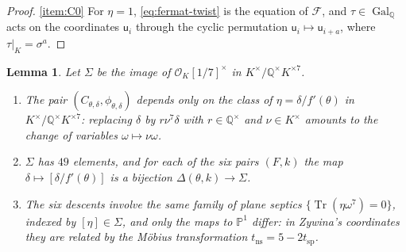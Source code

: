 \documentclass[12pt]{amsart}
\renewcommand{\P}{\mathbb{P}}
\newcommand{\Q}{\mathbb{Q}}
\newcommand{\Pone}{\P^{1}}
\newcommand{\calF}{{\mathcal F}}
\newcommand{\OO}{{\mathcal O}}
\newcommand{\sfu}{\mathsf{u}}
\DeclareMathOperator{\ns}{ns}
\DeclareMathOperator{\spc}{sp}
\DeclareMathOperator{\Gal}{Gal}
\DeclareMathOperator{\Tr}{Tr}
\numberwithin{equation}{section}
\newtheorem{lemma}[theorem]{Lemma}
\theoremstyle{definition}
\begin{document}
\begin{proof}
  \eqref{item:C0} For $\eta = 1$, \cref{eq:fermat-twist} is the equation of
  $\calF$, and $\tau \in \Gal_{\Q}$ acts on the coordinates $\sfu_i$ through
  the cyclic permutation $\sfu_i \mapsto \sfu_{i+a}$, where $\tau|_K = \sigma^a$.
\end{proof}

\begin{lemma}
  \label{lem:one-family}
  Let $\Sigma$ be the image of $\OO_K[1/7]^{\times}$ in
  $K^{\times}/\Q^{\times}K^{\times 7}$.
  \begin{enumerate}
  \item \label{item:eta-class} The pair $(C_{\theta,\delta},\phi_{\theta,\delta})$
    depends only on the class of $\eta = \delta/f'(\theta)$ in
    $K^{\times}/\Q^{\times}K^{\times 7}$: replacing $\delta$ by $r\nu^{7}\delta$
    with $r \in \Q^{\times}$ and $\nu \in K^{\times}$ amounts to the change of
    variables $\omega \mapsto \nu\omega$.
  \item \label{item:bijection} $\Sigma$ has $49$ elements, and for each of the
    six pairs $(F,k)$ the map $\delta \mapsto [\delta/f'(\theta)]$ is a bijection
    $\Delta(\theta,k) \to \Sigma$.
  \item \label{item:same-curves} The six descents involve \emph{the same}
    family of plane septics $\{\Tr(\eta\omega^{7}) = 0\}$, indexed by
    $[\eta] \in \Sigma$, and only the
    maps to $\Pone$ differ: in Zywina's coordinates they are related by the
    M\"obius transformation $t_{\ns} = 5 - 2t_{\spc}$.
  \end{enumerate}
\end{lemma}
\end{document}
